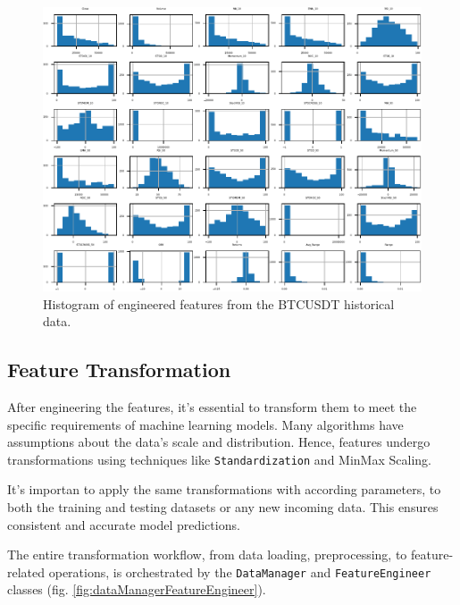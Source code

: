 \begin{figure}[h]
\centering
\begin{adjustbox}{max width=1\textwidth,center}
    \includegraphics[scale=1]{./pdf/dataset_histogram.pdf}
\end{adjustbox}
\caption{Histogram of engineered features from the BTCUSDT historical data.}
\label{fig:dataset_histogram}
\end{figure}

\subsection{Feature Transformation}

After engineering the features, it's essential to transform them to meet the specific requirements of machine learning models. Many algorithms have assumptions about the data's scale and distribution.
Hence, features undergo transformations using techniques like \texttt{Standardization} and {MinMax Scaling}.

It's importan to apply the same transformations with according parameters, to both the training and testing datasets or any new incoming data. This ensures consistent and accurate model predictions.

The entire transformation workflow, from data loading, preprocessing, to feature-related operations, is orchestrated by the \texttt{DataManager} and \texttt{FeatureEngineer} classes (fig. \ref{fig:dataManagerFeatureEngineer}).



